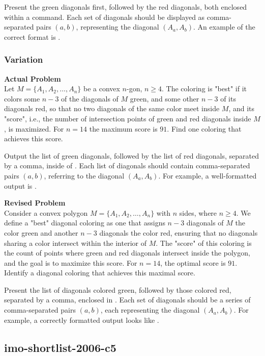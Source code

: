Present the green diagonals first, followed by the red diagonals, both enclosed within a \boxed command. Each set of diagonals should be displayed as comma-separated pairs $(a,b)$, representing the diagonal $(A_a, A_b)$. An example of the correct format is .

\subsubsection{Variation}
\textbf{Actual Problem}\\
Let $M=\{A_1, A_2, \ldots, A_n\}$ be a convex $n$-gon, $n \geq 4$. 
The coloring is "best" if it colors some $n-3$ of the diagonals of $M$ green, and some other $n-3$ of its diagonals red, so that no two diagonals of the same color meet inside $M$, and its "score", i.e., the number of intersection points of green and red diagonals inside $M$, is maximized.
For $n=14$ the maximum score is $91$.
Find one coloring that achieves this score. 


Output the list of green diagonals, followed by the list of red diagonals, separated by a comma, inside of \boxed. Each list of diagonals should contain comma-separated pairs $(a,b)$, referring to the diagonal $(A_a, A_b)$. For example, a well-formatted output is .

\textbf{Revised Problem}\\
Consider a convex polygon $M = \{A_1, A_2, \ldots, A_n\}$ with $n$ sides, where $n \geq 4$. We define a "best" diagonal coloring as one that assigns $n-3$ diagonals of $M$ the color green and another $n-3$ diagonals the color red, ensuring that no diagonals sharing a color intersect within the interior of $M$. The "score" of this coloring is the count of points where green and red diagonals intersect inside the polygon, and the goal is to maximize this score. For $n=14$, the optimal score is $91$. Identify a diagonal coloring that achieves this maximal score.

Present the list of diagonals colored green, followed by those colored red, separated by a comma, enclosed in \boxed. Each set of diagonals should be a series of comma-separated pairs $(a,b)$, each representing the diagonal $(A_a, A_b)$. For example, a correctly formatted output looks like .

\subsection{imo-shortlist-2006-c5}
